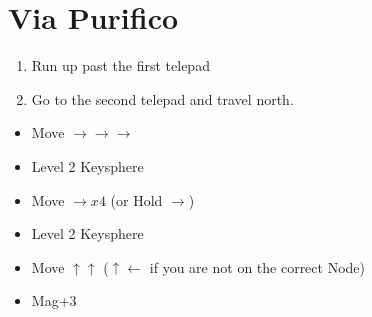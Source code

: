 \chapter{Via Purifico}

\begin{enumerate}
    \item Run up past the first telepad
    \item Go to the second telepad and travel north.
\end{enumerate}
\bothvfill
\winvfill
\begin{spheregrid}
    \begin{itemize}
        \auronf
        \begin{itemize}
            \item Move $\rightarrow\rightarrow\rightarrow$
            \item Level 2 Keysphere
            \item Move $\rightarrow x4$ (or Hold $\rightarrow$)
            \item Level 2 Keysphere
            \item Move $\uparrow\uparrow$ ($\uparrow\leftarrow$ if you are not on the correct Node)
            \item Mag+3
        \end{itemize}

\end{itemize}
\end{spheregrid}
